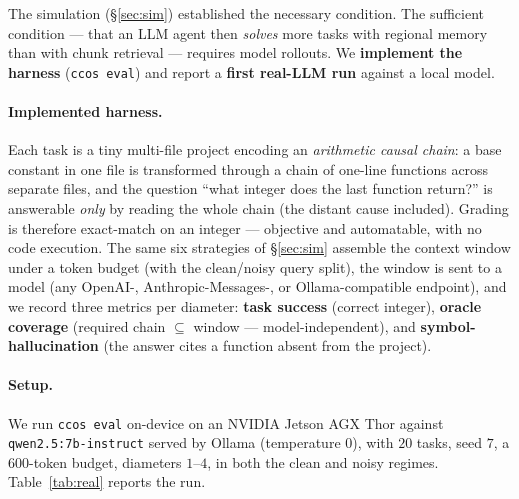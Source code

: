 \documentclass[11pt]{article}
\newcommand{\code}[1]{\texttt{#1}}
\begin{document}
The simulation (\S\ref{sec:sim}) established the necessary condition. The
sufficient condition --- that an LLM agent then \emph{solves} more tasks with
regional memory than with chunk retrieval --- requires model rollouts. We
\textbf{implement the harness} (\code{ccos eval}) and report a \textbf{first
real-LLM run} against a local model.

\paragraph{Implemented harness.} Each task is a tiny multi-file project encoding
an \emph{arithmetic causal chain}: a base constant in one file is transformed
through a chain of one-line functions across separate files, and the question
``what integer does the last function return?'' is answerable \emph{only} by
reading the whole chain (the distant cause included). Grading is therefore
exact-match on an integer --- objective and automatable, with no code execution.
The same six strategies of \S\ref{sec:sim} assemble the context window under a
token budget (with the clean/noisy query split), the window is sent to a model
(any OpenAI-, Anthropic-Messages-, or Ollama-compatible endpoint), and we record
three metrics per diameter: \textbf{task success} (correct integer),
\textbf{oracle coverage} (required chain $\subseteq$ window --- model-independent),
and \textbf{symbol-hallucination} (the answer cites a function absent from the
project).

\paragraph{Setup.} We run \code{ccos eval} on-device on an NVIDIA Jetson AGX Thor
against \code{qwen2.5:7b-instruct} served by Ollama (temperature $0$), with $20$
tasks, seed $7$, a $600$-token budget, diameters $1$--$4$, in both the clean and
noisy regimes. Table~\ref{tab:real} reports the run.
\end{document}
